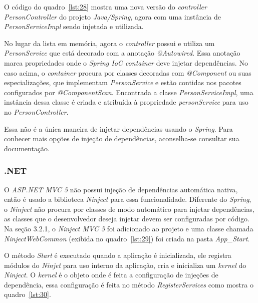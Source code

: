 \documentclass[a4paper,12pt]{article}
\newcommand{\est}[1] {
\textit{#1}}
\newcommand{\classe}[1] {
\textit{#1}}
\newcommand{\arquivo}[1] {
\textit{#1}}
\newcommand{\annotation}[1] {
\textit{#1}}
\newcommand{\metodo}[1] {
\textit{#1}}
\newcommand{\javacode}[3] {
	
}
\newcommand{\sharpcode}[3] {
	
}
\begin{document}
O código do quadro~\ref{lst:28} mostra uma nova versão do \est{controller} \classe{PersonController} do projeto \est{Java/Spring}, agora com uma instância de \classe{PersonServiceImpl} sendo injetada e utilizada.

\javacode{code/28.txt}{\classe{PersonController} utilizando \classe{PersonService} no projeto \est{Java/Spring}}{lst:28}

No lugar da lista em memória, agora o \est{controller} possui e utiliza um \classe{PersonService} que  está decorado com a anotação \annotation{@Autowired}. Essa anotação marca propriedades onde o \est{Spring IoC container} deve injetar dependências. No caso acima, o \est{container} procura por classes decoradas com \annotation{@Component} ou suas especializações, que implementam \classe{PersonService} e estão contidas nos pacotes configurados por \annotation{@ComponentScan}. Encontrada a classe \classe{PersonServiceImpl}, uma instância dessa classe é criada e atribuída à propriedade \est{personService} para uso no \classe{PersonController}.

Essa não é a única maneira de injetar dependências usando o \est{Spring}. Para conhecer mais opções de injeção de dependências, aconselha-se consultar sua documentação.

\subsubsection{.NET}

O \est{ASP.NET MVC 5} não possui injeção de dependências automática nativa, então é usado a biblioteca \est{Ninject} para essa funcionalidade. Diferente do \est{Spring}, o \est{Ninject} não procura por classes de modo automático para injetar dependências, as classes que o desenvolvedor deseja injetar devem ser configuradas por código. Na seção 3.2.1, o \est{Ninject MVC 5} foi adicionado ao projeto e uma classe chamada \classe{NinjectWebCommon} (exibida no quadro~\ref{lst:29}) foi criada na pasta \arquivo{App\_Start}. 

\sharpcode{code/29.txt}{Classe \classe{NinjectWebCommon}}{lst:29}

O método \metodo{Start} é executado quando a aplicação é inicializada, ele registra módulos do \est{Ninjet} para uso interno da aplicação, cria e inicializa um \est{kernel} do \est{Ninject}. O \est{kernel} é o objeto onde é feita a configuração de injeções de dependência, essa configuração é feita no método \metodo{RegisterServices} como mostra o quadro~\ref{lst:30}.
\end{document}
